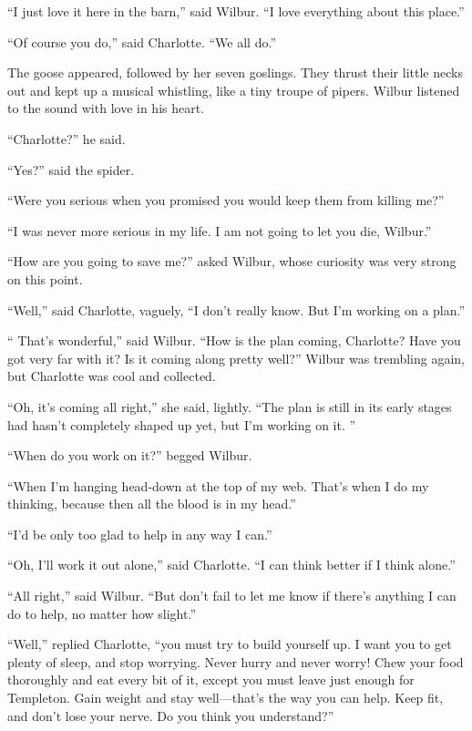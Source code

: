\documentclass[a4paper, oneside]{book}
\begin{document}
 ``I just love it here in the barn,'' said Wilbur. ``I love everything
about this place.''

 ``Of course you do,'' said Charlotte. ``We all do.''

 The goose appeared, followed by her seven goslings. They
thrust their little necks out and kept up a musical whistling, like a
tiny troupe of pipers. Wilbur listened to the sound with love in his
heart. 

``Charlotte?'' he said.

 ``Yes?'' said the spider.

 ``Were you serious when you promised you would keep them
from killing me?'' 

``I was never more serious in my life. I am not going to let you
die, Wilbur.''

 ``How are you going to save me?'' asked Wilbur, whose
curiosity was very strong on this point.

 ``Well,'' said Charlotte, vaguely, ``I don't really know. But I'm
working on a plan.''

 `` That's wonderful,'' said Wilbur. ``How is the plan coming,
Charlotte? Have you got very far with it? Is it coming along pretty
well?'' Wilbur was trembling again, but Charlotte was cool and
collected.

 ``Oh, it's coming all right,'' she said, lightly. ``The plan is still in
its early stages had hasn't completely shaped up yet, but I'm
working on it. ''

``When do you work on it?'' begged Wilbur.

 ``When I'm hanging head-down at the top of my web. That’s
when I do my thinking, because then all the blood is in my head.''

 ``I'd be only too glad to help in any way I can.''

 ``Oh, I'll work it out alone,'' said Charlotte. ``I can think better if
I think alone.''

 ``All right,'' said Wilbur. ``But don't fail to let me know if there's
anything I can do to help, no matter how slight.''

``Well,'' replied Charlotte, ``you must try to build yourself up. I
 want you to get plenty of sleep, and stop worrying. Never hurry and
never worry! Chew your food thoroughly and eat every bit of it,
except you must leave just enough for Templeton. Gain weight and
stay well—that’s the way you can help. Keep fit, and don’t lose your
nerve. Do you think you understand?''
\end{document}
